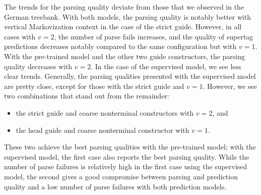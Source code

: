 \documentclass[../../document.tex]{subfiles}
\begin{document}
    The trends for the parsing quality deviate from those that we observed in the German \negra{} treebank.
    With both models, the parsing quality is notably better with vertical Markovization context in the case of the strict guide.
    However, in all cases with $v=2$, the number of parse fails increases, and the quality of supertag predictions decreases notably compared to the same configuration but with $v=1$.
    With the pre-trained model and the other two guide constructors, the parsing quality decreases with $v=2$.
    In the case of the supervised model, we see less clear trends.
    Generally, the parsing qualities presented with the supervised model are pretty close, except for those with the strict guide and $v=1$.
    However, we see two combinations that stand out from the remainder:
    \begin{itemize}
        \item the strict guide and coarse nonterminal constructors with $v=2$, and
        \item the head guide and coarse nonterminal constructor with $v=1$.
    \end{itemize}
    These two achieve the best parsing qualities with the pre-trained model; with the supervised model, the first case also reports the best parsing quality.
    While the number of parse failures is relatively high in the first case using the supervised model, the second gives a good compromise between parsing and prediction quality and a low number of parse failures with both prediction models.
\end{document}
